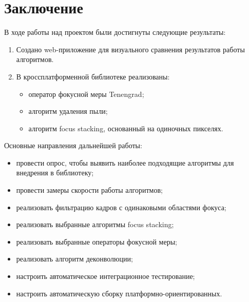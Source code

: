 \documentclass[14pt]{matmex-diploma-custom}
\begin{document}
\section*{Заключение}
В ходе работы над проектом были достигнуты следующие результаты:
\begin{enumerate}
    \item Создано web-приложение для визуального сравнения результатов работы алгоритмов. 
    \item В кроссплатформенной библиотеке реализованы:
        \begin{itemize}
            \item оператор фокусной меры Tenengrad;
            \item алгоритм удаления пыли;
            \item алгоритм focus stacking, основанный на одиночных пикселях.
        \end{itemize}
\end{enumerate}

\par
Основные направления дальнейшей работы:
\begin{itemize}
    \item провести опрос, чтобы выявить наиболее подходящие алгоритмы для внедрения в библиотеку;
    \item провести замеры скорости работы алгоритмов;
    \item реализовать фильтрацию кадров с одинаковыми областями фокуса;
    \item реализовать выбранные алгоритмы focus stacking;
    \item реализовать выбранные операторы фокусной меры;
    \item реализовать алгоритм деконволюции;
    \item настроить автоматическое интеграционное тестирование;
    \item настроить автоматическую сборку платформно-ориентированных.
\end{itemize}

\setmonofont[Mapping=tex-text]{CMU Typewriter Text}


\end{document}
